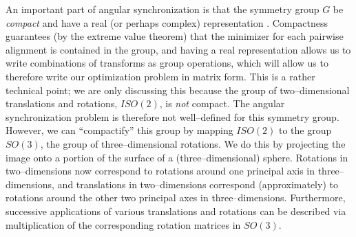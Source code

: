 \documentclass[12pt]{article}
\begin{document}
An important part of angular synchronization is that the symmetry group $G$ be {\em compact} and have a real (or perhaps complex) representation \cite{singer2011angular}.
%
Compactness guarantees (by the extreme value theorem) that the minimizer for each pairwise alignment is contained in the group,
and having a real representation allows us to write combinations of transforms as group operations, which will allow us to therefore write our optimization problem in matrix form. 
%
This is a rather technical point;
we are only discussing this because the group of two--dimensional translations and rotations, $ISO(2)$, is {\em not} compact.
%
The angular synchronization problem is therefore not well--defined for this symmetry group.
%
However, we can ``compactify'' this group by mapping $ISO(2)$ to the group $SO(3)$, the group of three--dimensional rotations.
%
We do this by projecting the image onto a portion of the surface of a (three--dimensional) sphere.
%
Rotations in two--dimensions now correspond to rotations around one principal axis in three--dimensions, and translations in two--dimensions correspond (approximately) to rotations around the other two principal axes in three--dimensions.
%
Furthermore, successive applications of various translations and rotations can be described via multiplication of the corresponding rotation matrices in $SO(3)$.
\end{document}
